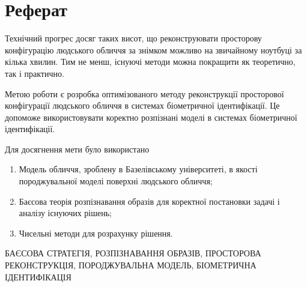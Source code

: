 \chapter*{Реферат}

Технічний прогрес досяг таких висот,
що реконструювати просторову конфігурацію людського обличчя за знімком
можливо на звичайному ноутбуці за кілька хвилин.
Тим не менш, існуючі методи можна покращити як теоретично, так і практично.

Метою роботи є
розробка оптимізованого методу реконструкції просторової конфігурації
людського обличчя в системах біометричної ідентифікації.
Це допоможе використовувати коректно розпізнані моделі
в системах біометричної ідентифікації.

Для досягнення мети було використано
\begin{enumerate}
  \item
    Модель обличчя, зроблену в Базелівському університеті,
    в якості породжувальної моделі поверхні людського обличчя;
  \item
    Баєсова теорія розпізнавання образів
    для коректної постановки задачі і аналізу існуючих рішень;
  \item
    Чисельні методи для розрахунку рішення.
\end{enumerate}

\MakeUppercase{баєсова стратегія, розпізнавання образів,
просторова реконструкція, породжувальна модель,
біометрична ідентифікація}
